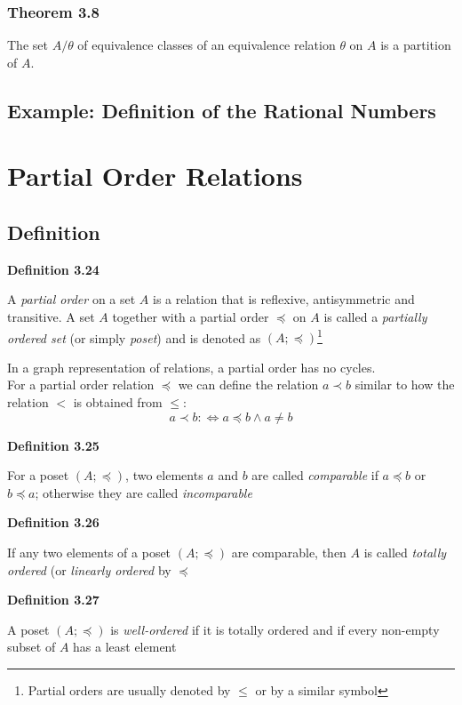 \documentclass[a4paper]{report}
\newenvironment{definition}[1]{\begin{framed}\centerline{\textbf{Definition #1}}\noindent\hspace{-1.1mm}}{\end{framed}}
\begin{document}
\subsubsection*{Theorem 3.8}
The set $A/\theta$ of equivalence classes of an equivalence relation $\theta$ on $A$ is a partition of $A$.

\subsection{Example: Definition of the Rational Numbers}

\section{Partial Order Relations}
\subsection{Definition}
\begin{definition}{3.24}
A \emph{partial order} on a set $A$ is a relation that is reflexive, antisymmetric and transitive. A set $A$ together with a partial order $\preceq$ on $A$ is called a \emph{partially ordered set} (or simply \emph{poset}) and is denoted as $(A;\preceq)$\footnote{Partial orders are usually denoted by $\leq$ or by a similar symbol}
\end{definition}

In a graph representation of relations, a partial order has no cycles. \\

For a partial order relation $\preceq$ we can define the relation $a\prec b$ similar to how the relation $<$ is obtained from $\leq$: \[a\prec b:\Longleftrightarrow a\preceq b\land a\not=b\]

\begin{definition}{3.25}
For a poset $(A;\preceq)$, two elements $a$ and $b$ are called \emph{comparable} if $a\preceq b$ or $b\preceq a$; otherwise they are called \emph{incomparable}
\end{definition}

\begin{definition}{3.26}
If any two elements of a poset $(A;\preceq)$ are comparable, then $A$ is called \emph{totally ordered} (or \emph{linearly ordered} by $\preceq$
\end{definition}

\begin{definition}{3.27}
A poset $(A;\preceq)$ is \emph{well-ordered} if it is totally ordered and if every non-empty subset of $A$ has a least element
\end{definition}
\end{document}
